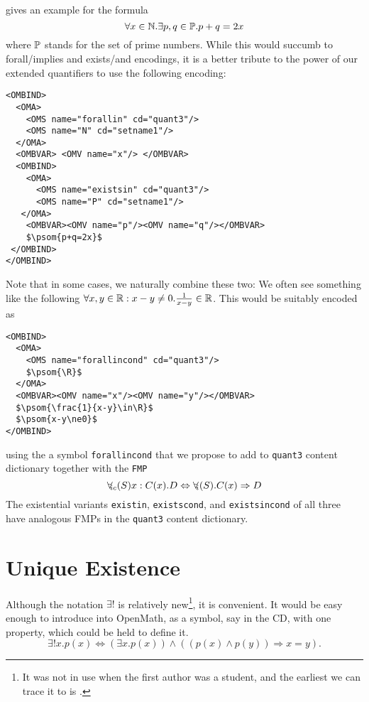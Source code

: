 \documentclass{llncs}
\def\forallin{\forall_{\kern-.25em i}}
\def\forallincond{\forall_{\kern-.25em ic}}
\begin{document}
\cite[section 4.2.5.1]{WorldWideWebConsortium2003b} gives an example for the formula
\[\forall{x\in\N}.\exists{p,q\in\P}.p+q=2x\]
where $\P$ stands for the set of prime numbers. While this would succumb to forall/implies
and exists/and encodings, it is a better tribute to the power of our extended quantifiers
to use the following encoding:
\begin{lstlisting}[mathescape]
<OMBIND>
  <OMA>
    <OMS name="forallin" cd="quant3"/>
    <OMS name="N" cd="setname1"/>
  </OMA>
  <OMBVAR> <OMV name="x"/> </OMBVAR>
  <OMBIND>
    <OMA>
      <OMS name="existsin" cd="quant3"/>
      <OMS name="P" cd="setname1"/>
   </OMA>
    <OMBVAR><OMV name="p"/><OMV name="q"/></OMBVAR>
    $\psom{p+q=2x}$
 </OMBIND>
</OMBIND>
\end{lstlisting}

Note that in some cases, we naturally combine these two: We often see something like the
following $\forall x,y\in\R:x-y\ne0.{\frac{1}{x-y}\in\R}$. This would be 
suitably encoded as
\begin{lstlisting}[mathescape]
<OMBIND>
  <OMA>
    <OMS name="forallincond" cd="quant3"/>
    $\psom{\R}$
  </OMA> 
  <OMBVAR><OMV name="x"/><OMV name="y"/></OMBVAR>
  $\psom{\frac{1}{x-y}\in\R}$
  $\psom{x-y\ne0}$
</OMBIND>
\end{lstlisting}
using the a symbol {\texttt{forallincond}} that we propose to add to {\texttt{quant3}}
content dictionary together with the {\texttt{FMP}}
\[\forallincond{(S)}x:{C(x)}.D \Leftrightarrow\forallin(S).C(x)\Rightarrow D\]
The existential variants {\texttt{existin}}, {\texttt{existscond}}, and
{\texttt{existsincond}} of all three have analogous FMPs in the {\texttt{quant3}} content
dictionary.

\section{Unique Existence}

Although the notation $\exists!$ is relatively new\footnote{It was not in use when the
  first author was a student, and the earliest we can trace it to is
  \cite[p. xiii]{Barendregt1984}.}, it is convenient. It would be easy enough to introduce
into OpenMath, as a symbol, say {} in the {} CD,
with one property, which could be held to define it.
\begin{equation}\label{eq:eu}
\exists! x.p(x) \Leftrightarrow (\exists x.p(x))\land
\left((p(x)\land p(y))\Rightarrow x=y\right).
\end{equation}
\end{document}
